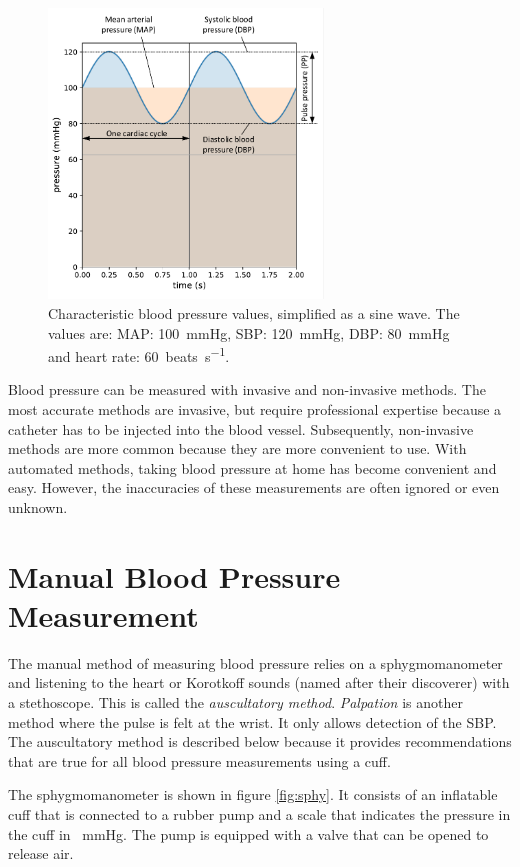 \begin{figure}[ht]
\centering
\includegraphics[width=0.65\textwidth]{figures/MAP.pdf}
\caption{Characteristic blood pressure values, simplified as a sine wave. The values are: MAP: \SI{100}{\mmHg}, SBP: \SI{120}{\mmHg}, DBP: \SI{80}{\mmHg} and heart rate: \SI{60}{beats\per\second}.}
\label{fig:BP}
\end{figure}


Blood pressure can be measured with invasive and non-invasive methods. The most accurate methods are invasive, but require professional expertise because a catheter has to be injected into the blood vessel. Subsequently, non-invasive methods are more common because they are more convenient to use. With automated methods, taking blood pressure at home has become convenient and easy. However, the inaccuracies of these measurements are often ignored or even unknown.

\section{Manual Blood Pressure Measurement}
The manual method of measuring blood pressure relies on a sphygmomanometer and listening to the heart or Korotkoff sounds (named after their discoverer) with a stethoscope. This is called the \emph{auscultatory method}. \emph{Palpation} is another method where the pulse is felt at the wrist. It only allows detection of the SBP. The auscultatory method is described below because it provides recommendations that are true for all blood pressure measurements using a cuff.

The sphygmomanometer is shown in figure \ref{fig:sphy}. It consists of an inflatable cuff that is connected to a rubber pump and a scale that indicates the pressure in the cuff in \SI{}{\mmHg}. The pump is equipped with a valve that can be opened to release air.


